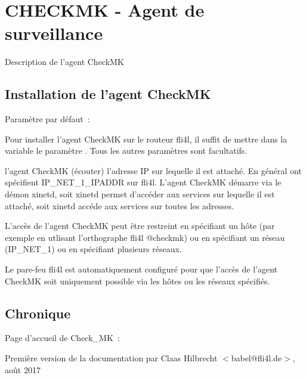 
\section {CHECKMK - Agent de surveillance}

Description de l'agent CheckMK

\subsection {Installation de l'agent CheckMK}

\begin{description}


  Paramètre par défaut~: 

  Pour installer l'agent CheckMK sur le routeur fli4l, il suffit de mettre
  dans la variable  le paramètre .
  Tous les autres paramètres sont facultatifs.


  l'agent CheckMK (écouter) l'adresse IP sur lequelle il est attaché.
  En général ont spécifient IP\_NET\_1\_IPADDR sur fli4l. L'agent CheckMK
  démarre via le démon xinetd, soit xinetd permet d'accéder aux services
  sur lequelle il est attaché, soit xinetd accéde aux services sur toutes
  les adresses.


  L'accès de l'agent CheckMK peut être restreint en spécifiant un hôte
  (par exemple en utlisant l'orthographe fli4l @checkmk) ou en spécifiant
  un réseau (IP\_NET\_1) ou en spécifiant plusieurs réseaux.

  Le pare-feu fli4l est automatiquement configuré pour que l'accès de l'agent
  CheckMK soit uniquement possible via les hôtes ou les réseaux spécifiés.

\end{description}

\subsection{Chronique}

Page d'accueil de Check\_MK~: 

Première version de la documentation par
Claas Hilbrecht $<$babel@fli4l.de$>$, août 2017

